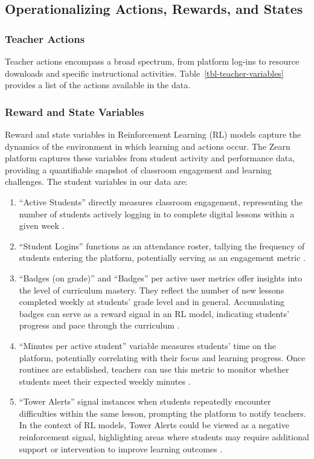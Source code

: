\documentclass[
  number,
  preprint,
  3p,
  onecolumn]{elsarticle}
\begin{document}
\subsection{Operationalizing Actions, Rewards, and
States}\label{operationalizing-actions-rewards-and-states}

\subsubsection{Teacher Actions}\label{teacher-actions}

Teacher actions encompass a broad spectrum, from platform log-ins to
resource downloads and specific instructional activities.
Table~\ref{tbl-teacher-variables} provides a list of the actions
available in the data.

\subsubsection{Reward and State
Variables}\label{reward-and-state-variables}

Reward and state variables in Reinforcement Learning (RL) models capture
the dynamics of the environment in which learning and actions occur. The
Zearn platform captures these variables from student activity and
performance data, providing a quantifiable snapshot of classroom
engagement and learning challenges. The student variables in our data
are:

\begin{enumerate}
\def\labelenumi{\arabic{enumi}.}
\item
  ``Active Students'' directly measures classroom engagement,
  representing the number of students actively logging in to complete
  digital lessons within a given week \citep{zearn2022}.
\item
  ``Student Logins'' functions as an attendance roster, tallying the
  frequency of students entering the platform, potentially serving as an
  engagement metric \citep{zearnaf}.
\item
  ``Badges (on grade)'' and ``Badges'' per active user metrics offer
  insights into the level of curriculum mastery. They reflect the number
  of new lessons completed weekly at students' grade level and in
  general. Accumulating badges can serve as a reward signal in an RL
  model, indicating students' progress and pace through the curriculum
  \citep{zearnae}.
\item
  ``Minutes per active student'' variable measures students' time on the
  platform, potentially correlating with their focus and learning
  progress. Once routines are established, teachers can use this metric
  to monitor whether students meet their expected weekly minutes
  \citep{zearn2022}.
\item
  ``Tower Alerts'' signal instances when students repeatedly encounter
  difficulties within the same lesson, prompting the platform to notify
  teachers. In the context of RL models, Tower Alerts could be viewed as
  a negative reinforcement signal, highlighting areas where students may
  require additional support or intervention to improve learning
  outcomes \citep{zearnad}.
\end{enumerate}
\end{document}
